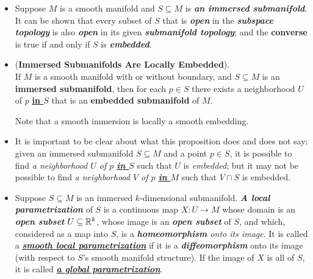 \documentclass[11pt]{article}
\begin{document}
\begin{itemize}
\item \begin{remark}
Suppose $M$ is a smooth manifold and $S \subseteq M$ is \emph{\textbf{an immersed submanifold}}. It can be shown that every subset of $S$ that is \emph{\textbf{open}} in the \emph{\textbf{subspace topology}} is also \emph{\textbf{open}} in its given \emph{\textbf{submanifold topology}}; and the \textbf{converse} is true if and only if $S$ is \textbf{\emph{embedded}}.
\end{remark} 


\item \begin{proposition} (\textbf{Immersed Submanifolds Are Locally Embedded}). \citep{lee2003introduction} \\
If $M$ is a smooth manifold with or without boundary, and $S \subseteq M$ is an \textbf{immersed submanifold}, then for each $p \in S$ there exists a neighborhood $U$ of $p$ \underline{\textbf{in $S$}} that is an \textbf{embedded submanifold} of $M$.
\end{proposition} Note that a smooth immersion is locally a smooth embedding.


\item \begin{remark}
It is important to be clear about what this proposition does and does not say: given an immersed submanifold $S \subseteq M$ and a point $p \in S$,  it is possible to find \emph{a neighborhood $U$ of $p$ \underline{\textbf{in $S$}}} such that \underline{$U$} is \emph{embedded}; but it may not be possible to find \emph{a neighborhood $V$ of $p$ \underline{\textbf{in $M$}}} such that \underline{$V \cap S$} is embedded. 
\end{remark}

\item \begin{definition}
Suppose $S \subseteq M$ is an immersed $k$-dimensional submanifold. \emph{\textbf{A local parametrization}} of $S$ is a continuous map $X: U \rightarrow M$ whose domain is an \emph{\textbf{open subset}} $U \subseteq {\mathbb R}^k$, whose image is an \emph{\textbf{open subset}} of $S$, and which, considered as a map into $S$, is a \emph{\textbf{homeomorphism} onto its image}. It is called a \underline{\emph{\textbf{smooth local parametrization}}} if it is a \emph{\textbf{diffeomorphism}} onto its image (with respect to $S$’s smooth manifold structure). If the image of $X$ is all of $S$, it is called \underline{\emph{\textbf{a global parametrization}}}.
\end{definition}


\end{itemize}
\end{document}
